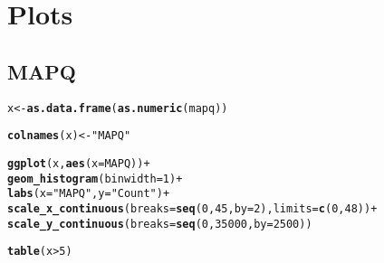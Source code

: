 \documentclass[12pt, a4paper]{article}\usepackage[]{graphicx}\usepackage[]{color}
\makeatletter
\newcommand{\hlnum}[1]{\textcolor[rgb]{0.686,0.059,0.569}{#1}}%
\newcommand{\hlstr}[1]{\textcolor[rgb]{0.192,0.494,0.8}{#1}}%
\newcommand{\hlopt}[1]{\textcolor[rgb]{0,0,0}{#1}}%
\newcommand{\hlstd}[1]{\textcolor[rgb]{0.345,0.345,0.345}{#1}}%
\newcommand{\hlkwb}[1]{\textcolor[rgb]{0.69,0.353,0.396}{#1}}%
\newcommand{\hlkwc}[1]{\textcolor[rgb]{0.333,0.667,0.333}{#1}}%
\newcommand{\hlkwd}[1]{\textcolor[rgb]{0.737,0.353,0.396}{\textbf{#1}}}%
\newenvironment{kframe}{%
 \def\at@end@of@kframe{}%
 \ifinner\ifhmode%
  \def\at@end@of@kframe{\end{minipage}}%
  \begin{minipage}{\columnwidth}%
 \fi\fi%
 \def\FrameCommand##1{\hskip\@totalleftmargin \hskip-\fboxsep
 \colorbox{shadecolor}{##1}\hskip-\fboxsep
     \hskip-\linewidth \hskip-\@totalleftmargin \hskip\columnwidth}%
 \MakeFramed {\advance\hsize-\width
   \@totalleftmargin\z@ \linewidth\hsize
   \@setminipage}}%
 {\par\unskip\endMakeFramed%
 \at@end@of@kframe}
\newenvironment{knitrout}{}{} %
\makeatother
\begin{document}
\section{Plots}
\subsection{MAPQ}
\begin{knitrout}
\color{fgcolor}\begin{kframe}
\begin{alltt}
\hlstd{x} \hlkwb{<-} \hlkwd{as.data.frame}\hlstd{(}\hlkwd{as.numeric}\hlstd{(mapq))}
\end{alltt}


{\ttfamily\noindent\bfseries\color{errorcolor}{\#\# Error in as.data.frame(as.numeric(mapq)): object 'mapq' not found}}\begin{alltt}
\hlkwd{colnames}\hlstd{(x)} \hlkwb{<-} \hlstr{"MAPQ"}
\end{alltt}


{\ttfamily\noindent\bfseries{}}\begin{alltt}
\hlkwd{ggplot}\hlstd{(x,} \hlkwd{aes}\hlstd{(}\hlkwc{x} \hlstd{= MAPQ))} \hlopt{+}
        \hlkwd{geom_histogram}\hlstd{(}\hlkwc{binwidth} \hlstd{=} \hlnum{1}\hlstd{)} \hlopt{+}
        \hlkwd{labs}\hlstd{(}\hlkwc{x} \hlstd{=} \hlstr{"MAPQ"}\hlstd{,} \hlkwc{y} \hlstd{=} \hlstr{"Count"}\hlstd{)} \hlopt{+}
        \hlkwd{scale_x_continuous}\hlstd{(}\hlkwc{breaks} \hlstd{=} \hlkwd{seq}\hlstd{(}\hlnum{0}\hlstd{,} \hlnum{45}\hlstd{,} \hlkwc{by} \hlstd{=} \hlnum{2}\hlstd{),} \hlkwc{limits} \hlstd{=} \hlkwd{c}\hlstd{(}\hlnum{0}\hlstd{,}\hlnum{48}\hlstd{))} \hlopt{+}
        \hlkwd{scale_y_continuous}\hlstd{(}\hlkwc{breaks} \hlstd{=} \hlkwd{seq}\hlstd{(}\hlnum{0}\hlstd{,}\hlnum{35000}\hlstd{,} \hlkwc{by} \hlstd{=} \hlnum{2500}\hlstd{))}
\end{alltt}


{\ttfamily\noindent\bfseries\color{errorcolor}{\#\# Error in ggplot(x, aes(x = MAPQ)): object 'x' not found}}\begin{alltt}
\hlkwd{table}\hlstd{(x} \hlopt{>} \hlnum{5}\hlstd{)}
\end{alltt}


{\ttfamily\noindent\bfseries\color{errorcolor}{\#\# Error in eval(expr, envir, enclos): object 'x' not found}}\end{kframe}
\end{knitrout}
\clearpage
\end{document}
